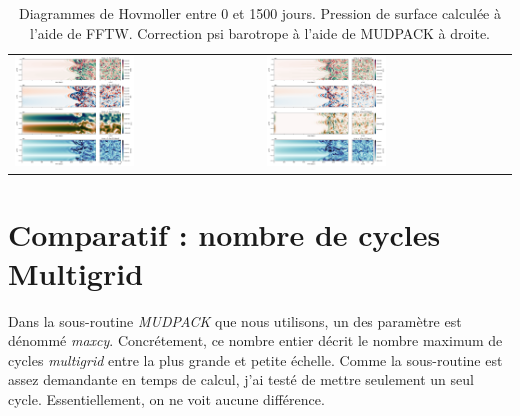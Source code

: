 \documentclass[10pt]{article}
\numberwithin{equation}{section}
\begin{document}
\begin{table}[htbp]
\caption{\label{tab:orgec7028b}Diagrammes de Hovmoller entre 0 et 1500 jours. Pression de surface calculée à l'aide de FFTW. Correction psi barotrope à l'aide de MUDPACK à droite.}
\centering
\begin{tabular}{ll}
\includegraphics[width=0.5\textwidth]{figures/tests/2023-06-15_hovmoller1_t=1500days_fft.png} & \includegraphics[width=0.5\textwidth]{figures/tests/2023-06-19_hovmoller1_t=1500days_mud.png}\\[0pt]
\end{tabular}
\end{table}

\newpage
\section{Comparatif : nombre de cycles Multigrid}
\label{sec:orgdf2a81d}
Dans la sous-routine \emph{MUDPACK} que nous utilisons, un des paramètre est dénommé \emph{maxcy}.
Concrétement, ce nombre entier décrit le nombre maximum de cycles \emph{multigrid} entre la plus grande et petite échelle.
Comme la sous-routine est assez demandante en temps de calcul, j'ai testé de mettre seulement un seul cycle.
Essentiellement, on ne voit aucune différence.
\end{document}
